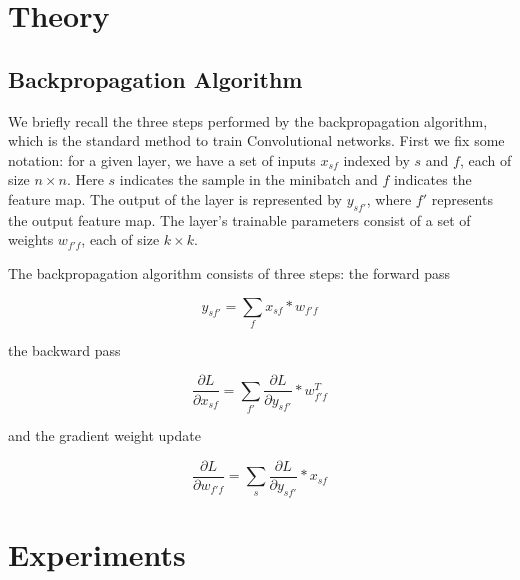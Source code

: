 \documentclass{article}
\begin{document}
\section{Theory}

\subsection{Backpropagation Algorithm}

We briefly recall the three steps performed by the backpropagation algorithm, which is the standard method to train Convolutional networks.
First we fix some notation: for a given layer, we have a set of inputs $x_{sf}$ indexed by $s$ and $f$, each of size $n \times n$.
Here $s$ indicates the sample in the minibatch and $f$ indicates the feature map. 
The output of the layer is represented by $y_{sf'}$, where $f'$ represents the output feature map. 
The layer's trainable parameters consist of a set of weights $w_{f'f}$, each of size $k \times k$.

The backpropagation algorithm consists of three steps: the forward pass

\begin{equation}
y_{sf'} = \sum_f x_{sf} \ast w_{f'f} 
\end{equation}

the backward pass

\begin{equation}
 \frac{\partial L}{\partial x_{sf}} = \sum_{f'} \frac{\partial L}{\partial y_{sf'}} \ast w_{f'f}^T
\end{equation}

and the gradient weight update

\begin{equation}
 \frac{\partial L}{\partial w_{f'f}} = \sum_{s} \frac{\partial L}{\partial y_{sf'}} \ast x_{sf}
\end{equation}




\section{Experiments}





\end{document}
